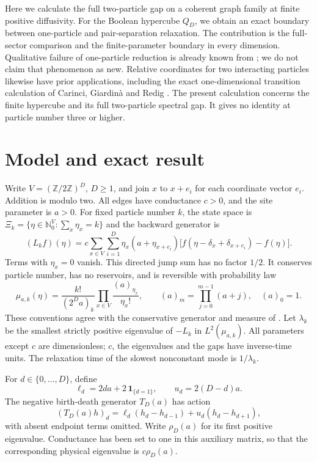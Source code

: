 \documentclass[11pt,a4paper]{article}
\newcommand{\ind}{\mathbf{1}}
\begin{document}
Here we calculate the full two-particle gap on a coherent graph family
at finite positive diffusivity. For the Boolean hypercube $Q_D$, we obtain
an exact boundary between one-particle and pair-separation relaxation.
The contribution is the full-sector comparison and the finite-parameter
boundary in every dimension. Qualitative failure of one-particle reduction
is already known from \cite{KimSau2026}; we do not claim that phenomenon
as new. Relative coordinates for two interacting particles likewise have
prior applications, including the exact one-dimensional transition
calculation of Carinci, Giardin\`a and Redig \cite{CarinciGiardinaRedig2017}.
The present calculation concerns the finite hypercube and its full
two-particle spectral gap. It gives no identity at particle number three
or higher.

\section{Model and exact result}
Write $V=(\mathbb Z/2\mathbb Z)^D$, $D\geq1$, and join $x$ to $x+e_i$
for each coordinate vector $e_i$. Addition is modulo two. All edges have
conductance $c>0$, and the site parameter is $a>0$. For fixed particle
number $k$, the state space is
$\Xi_k=\{\eta\in\mathbb N_0^V:\sum_x\eta_x=k\}$ and the backward
generator is
\begin{equation}\label{eq:generator}
 (L_k f)(\eta)=c\sum_{x\in V}\sum_{i=1}^D
 \eta_x(a+\eta_{x+e_i})
 \bigl[f(\eta-\delta_x+\delta_{x+e_i})-f(\eta)\bigr].
\end{equation}
Terms with $\eta_x=0$ vanish. This directed jump sum has no factor
$1/2$. It conserves particle number, has no reservoirs, and is reversible
with probability law
\begin{equation}\label{eq:measure}
 \mu_{a,k}(\eta)=\frac{k!}{(2^D a)_k}
 \prod_{x\in V}\frac{(a)_{\eta_x}}{\eta_x!},
 \qquad (a)_m=\prod_{j=0}^{m-1}(a+j),\quad (a)_0=1.
\end{equation}
These conventions agree with the conservative generator and measure of
\cite[Eqs.~(2.1)--(2.2)]{KimSau2026}.
Let $\lambda_k$ be the smallest strictly positive eigenvalue of $-L_k$
in $L^2(\mu_{a,k})$. All parameters except $c$ are dimensionless;
$c$, the eigenvalues and the gaps have inverse-time units. The relaxation
time of the slowest nonconstant mode is $1/\lambda_k$.

For $d\in\{0,\ldots,D\}$, define
\begin{equation}\label{eq:rates}
 \ell_d=2da+2\,\ind_{\{d=1\}},\qquad u_d=2(D-d)a.
\end{equation}
The negative birth-death generator $T_D(a)$ has action
\begin{equation}\label{eq:radial}
 (T_D(a)h)_d=\ell_d(h_d-h_{d-1})+u_d(h_d-h_{d+1}),
\end{equation}
with absent endpoint terms omitted. Write $\rho_D(a)$ for its first
positive eigenvalue. Conductance has been set to one in this auxiliary
matrix, so that the corresponding physical eigenvalue is $c\rho_D(a)$.
\end{document}
